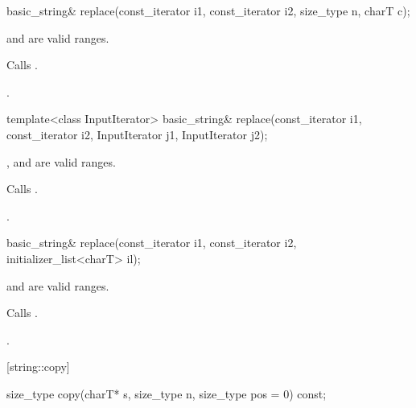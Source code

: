 %
%
\begin{itemdecl}
basic_string& replace(const_iterator i1, const_iterator i2, size_type n,
                      charT c);
\end{itemdecl}

\begin{itemdescr}
\pnum
\requires {} and  are valid ranges.

\pnum
\effects Calls .

\pnum
\returns
{}.
\end{itemdescr}

%
%
\begin{itemdecl}
template<class InputIterator>
  basic_string& replace(const_iterator i1, const_iterator i2,
                        InputIterator j1, InputIterator j2);
\end{itemdecl}

\begin{itemdescr}
\pnum
\requires {},  and  are valid ranges.

\pnum
\effects Calls .

\pnum
\returns
{}.
\end{itemdescr}

%
%
\begin{itemdecl}
basic_string& replace(const_iterator i1, const_iterator i2,
                      initializer_list<charT> il);
\end{itemdecl}

\begin{itemdescr}
\pnum
\requires {} and  are valid ranges.

\pnum
\effects Calls .

\pnum
{}.
\end{itemdescr}


[string::copy]{}

%
%
\begin{itemdecl}
size_type copy(charT* s, size_type n, size_type pos = 0) const;
\end{itemdecl}

